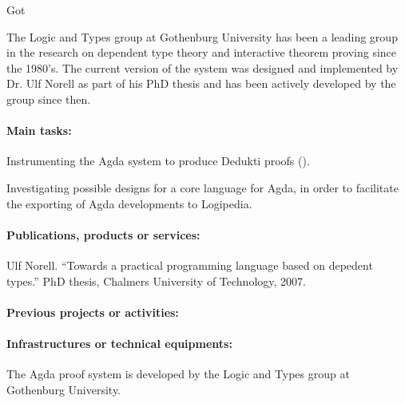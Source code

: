 \begin{sitedescription}{Got}


The Logic and Types group at Gothenburg University has been a leading group
in the research on dependent type theory and interactive theorem proving
since the 1980's. The current version of the system was designed and
implemented by Dr. Ulf Norell as part of his PhD thesis and has been
actively developed by the group since then.

\paragraph*{Main tasks:}

\begin{compactitem}
\item Instrumenting the Agda system to produce Dedukti proofs
  ().
\item Investigating possible designs for a core language for Agda, in
  order to facilitate the exporting of Agda developments to Logipedia.
\end{compactitem}

\paragraph*{Publications, products or services:}
\begin{compactitem}
  \item Ulf Norell. ``Towards a practical programming language based on
  depedent types.'' PhD thesis, Chalmers University of Technology, 2007.
\end{compactitem}

\paragraph*{Previous projects or activities:}

\paragraph*{Infrastructures or technical equipments:}
\begin{compactitem}
\item The Agda proof system is developed by the Logic and Types group at
Gothenburg University.
\end{compactitem}


\end{sitedescription}
